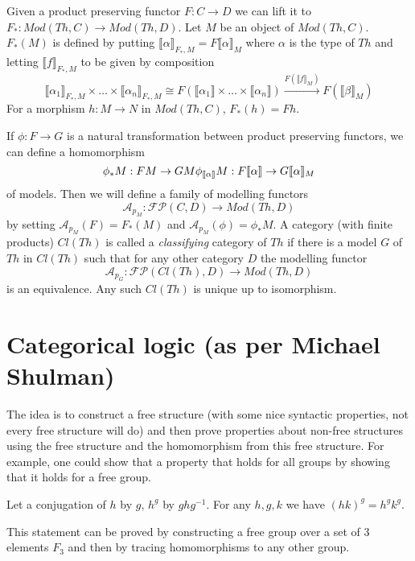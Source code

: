 \documentclass[acmsmall,screen, nonacm, anonymous]{acmart}
\begin{document}
Given a product preserving functor $F : C \to D$ we can lift it to $F_{*} : Mod(Th, C) \to Mod(Th,D)$.
Let $M$ be an object of $Mod(Th,C)$.
$F_{*}(M)$ is defined by putting $\llbracket \alpha \rrbracket_{F_{*}, M} = F\llbracket \alpha \rrbracket_{M}$ where $\alpha$ is the type of $Th$ and letting
$\llbracket f \rrbracket_{F_{*},M}$ to be given by composition
\[
  \llbracket \alpha_{1} \rrbracket_{F_{*}, M} \times \ldots \times \llbracket \alpha_{n} \rrbracket_{F_{*}, M} \cong F(\llbracket \alpha_{1} \rrbracket \times \ldots \times \llbracket \alpha_{n} \rrbracket) \xrightarrow{F(\llbracket f \rrbracket_{M})} F(\llbracket \beta \rrbracket_{M})
\]
For a morphism $h : M \to N$ in $Mod(Th,C)$, $F_{*}(h) = Fh$.

If $\phi : F \to G$ is a natural transformation between product preserving functors, we can define a homomorphism
\[
\phi_{*}M : FM \to GM\\
\phi_{\llbracket \alpha \rrbracket}M : F\llbracket \alpha \rrbracket \to G\llbracket \alpha \rrbracket_{M}
\]
of models.
Then we will define a family of modelling functors
\[
\mathcal{A}_{p_{M}} : \mathcal{FP}(C,D) \to Mod(Th,D)
\]
by setting $\mathcal{A}_{p_{M}}(F) = F_{*}(M)$ and $\mathcal{A}_{p_{M}}(\phi) = \phi_{*}M$.
A category (with finite products) $Cl(Th)$ is called a \emph{classifying} category of $Th$ if there is a model $G$ of $Th$ in $Cl(Th)$ such that for any other category $D$ the modelling functor
\[
\mathcal{A}_{p_{G}} : \mathcal{FP}(Cl(Th),D) \to Mod(Th,D)
\]
is an equivalence.
Any such $Cl(Th)$ is unique up to isomorphism.


\section{Categorical logic (as per Michael Shulman)}

The idea is to construct a free structure (with some nice syntactic properties, not every free structure will do) and then prove properties about non-free structures using the free structure and the homomorphism from this free structure.
For example, one could show that a property that holds for all groups by showing that it holds for a free group.

\begin{example}

Let a conjugation of $h$ by $g$, $h^{g}$ by $ghg^{-1}$.
For any $h,g,k$ we have $(hk)^{g} = h^{g}k^{g}$.

This statement can be proved by constructing a free group over a set of 3 elements $F_{3}$ and then by tracing homomorphisms to any other group.
\end{example}
\end{document}
